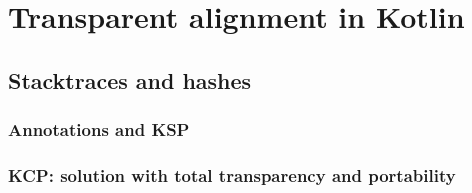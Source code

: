 \chapter{Transparent alignment in Kotlin}\label{chapter:alignment}

\section{Stacktraces and hashes}
\subsection{Annotations and KSP}
\subsection{KCP: solution with total transparency and portability}